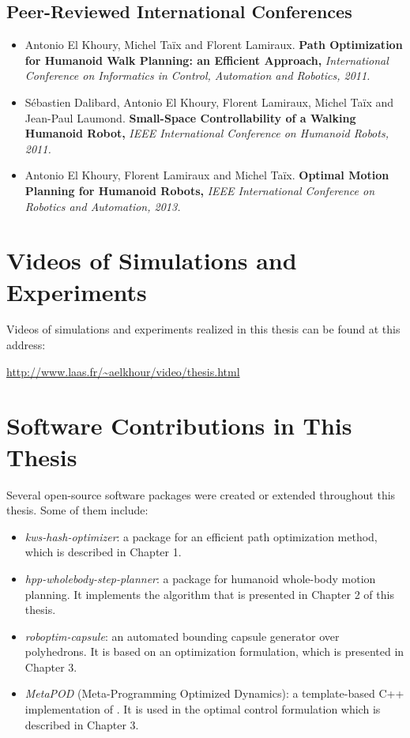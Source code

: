 \subsection*{Peer-Reviewed International Conferences}
\begin{itemize}
\item Antonio El Khoury, Michel Ta\"ix and Florent
  Lamiraux. \textbf{Path Optimization for Humanoid Walk Planning: an
    Efficient Approach,} \textit{International Conference on
    Informatics in Control, Automation and Robotics, 2011.}

\item S\'ebastien Dalibard, Antonio El Khoury, Florent Lamiraux,
  Michel Ta\"ix and Jean-Paul Laumond. \textbf{Small-Space
    Controllability of a Walking Humanoid Robot,} \textit{IEEE
    International Conference on Humanoid Robots, 2011.}

\item Antonio El Khoury, Florent Lamiraux and Michel
  Ta\"ix. \textbf{Optimal Motion Planning for Humanoid Robots,}
  \textit{IEEE International Conference on \linebreak Robotics and Automation,
    2013.}
\end{itemize}

\section*{Videos of Simulations and Experiments}

Videos of simulations and experiments realized in this thesis can be
found at this address:

\noindent\url{http://www.laas.fr/~aelkhour/video/thesis.html}

\section*{Software Contributions in This Thesis}

Several open-source software packages were created or extended
throughout this thesis. Some of them include:

\begin{itemize}
  \item \textit{kws-hash-optimizer}: a package for an efficient path
    optimization method, which is described in Chapter 1.
  \item \textit{hpp-wholebody-step-planner}: a package for humanoid whole-body
    motion planning. It implements the algorithm that is presented in
    Chapter 2 of this thesis.
  \item \textit{roboptim-capsule}: an automated bounding capsule generator over
    polyhedrons. It is based on an optimization formulation, which is
    presented in Chapter 3.
  \item \textit{MetaPOD} (Meta-Programming Optimized Dynamics): a
    template-based C++ implementation of \cite{feat08}. It is used in
    the optimal control formulation which is described in Chapter 3.
\end{itemize}
